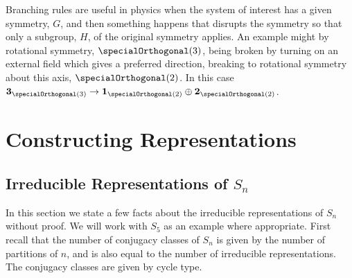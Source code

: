Branching rules are useful in physics when the system of interest has a
given symmetry, \(G\), and then something happens that disrupts the symmetry so
that only a subgroup, \(H\), of the original symmetry applies.
An example might by rotational symmetry, \(\specialOrthogonal(3)\), being
broken by turning on an external field which gives a preferred direction,
breaking to rotational symmetry about this axis, \(\specialOrthogonal(2)\).
In this case \(\rep{3}_{\specialOrthogonal(3)} \to
\rep{1}_{\specialOrthogonal(2)} \directsum \rep{2}_{\specialOrthogonal(2)}\).

\section{Constructing Representations}
\subsection{Irreducible Representations of
    \texorpdfstring{\(S_n\)}{Sn}}\label{sec:irrep Sn}
In this section we state a few facts about the irreducible representations
of \(S_n\) without proof.
We will work with \(S_5\) as an example where appropriate.
First recall that the number of conjugacy classes of \(S_n\) is given by the
number of partitions of \(n\), and is also equal to the number of irreducible
representations.
The conjugacy classes are given by cycle type.

